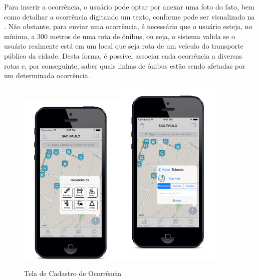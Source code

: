 Para inserir a ocorrência, o usuário pode optar por anexar uma foto do fato, bem como detalhar a ocorrência digitando um texto, conforme pode ser visualizado na . Não obstante, para enviar uma ocorrência, é necessário que o usuário esteja, no mínimo, a 300 metros de uma rota de ônibus, ou seja, o sistema valida se o usuário realmente está em um local que seja rota de um veículo do transporte público da cidade. Desta forma, é possível associar cada ocorrência a diversas rotas e, por conseguinte, saber quais linhas de ônibus estão sendo afetadas por um determinada ocorrência.
	
\begin{figure}[htp]
\begin{center}
  \includegraphics[width=5cm]{images/telas/cadastroDeOcorrencia.png}
   \includegraphics[width=5cm]{images/telas/cadastroDeOcorrencia2.png}
  \caption{Tela de Cadastro de Ocorrência}
  \label{fig:telaCadastroDeOcorrencia}
\end{center}
\end{figure}

